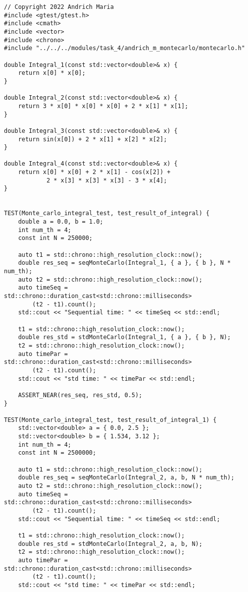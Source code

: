 \documentclass{report}
\begin{document}
\begin{lstlisting}
// Copyright 2022 Andrich Maria
#include <gtest/gtest.h>
#include <cmath>
#include <vector>
#include <chrono>
#include "../../../modules/task_4/andrich_m_montecarlo/montecarlo.h"

double Integral_1(const std::vector<double>& x) {
    return x[0] * x[0];
}

double Integral_2(const std::vector<double>& x) {
    return 3 * x[0] * x[0] * x[0] + 2 * x[1] * x[1];
}

double Integral_3(const std::vector<double>& x) {
    return sin(x[0]) + 2 * x[1] + x[2] * x[2];
}

double Integral_4(const std::vector<double>& x) {
    return x[0] * x[0] + 2 * x[1] - cos(x[2]) +
            2 * x[3] * x[3] * x[3] - 3 * x[4];
}


TEST(Monte_carlo_integral_test, test_result_of_integral) {
    double a = 0.0, b = 1.0;
    int num_th = 4;
    const int N = 250000;

    auto t1 = std::chrono::high_resolution_clock::now();
    double res_seq = seqMonteCarlo(Integral_1, { a }, { b }, N * num_th);
    auto t2 = std::chrono::high_resolution_clock::now();
    auto timeSeq = std::chrono::duration_cast<std::chrono::milliseconds>
        (t2 - t1).count();
    std::cout << "Sequential time: " << timeSeq << std::endl;

    t1 = std::chrono::high_resolution_clock::now();
    double res_std = stdMonteCarlo(Integral_1, { a }, { b }, N);
    t2 = std::chrono::high_resolution_clock::now();
    auto timePar = std::chrono::duration_cast<std::chrono::milliseconds>
        (t2 - t1).count();
    std::cout << "std time: " << timePar << std::endl;

    ASSERT_NEAR(res_seq, res_std, 0.5);
}

TEST(Monte_carlo_integral_test, test_result_of_integral_1) {
    std::vector<double> a = { 0.0, 2.5 };
    std::vector<double> b = { 1.534, 3.12 };
    int num_th = 4;
    const int N = 2500000;

    auto t1 = std::chrono::high_resolution_clock::now();
    double res_seq = seqMonteCarlo(Integral_2, a, b, N * num_th);
    auto t2 = std::chrono::high_resolution_clock::now();
    auto timeSeq = std::chrono::duration_cast<std::chrono::milliseconds>
        (t2 - t1).count();
    std::cout << "Sequential time: " << timeSeq << std::endl;

    t1 = std::chrono::high_resolution_clock::now();
    double res_std = stdMonteCarlo(Integral_2, a, b, N);
    t2 = std::chrono::high_resolution_clock::now();
    auto timePar = std::chrono::duration_cast<std::chrono::milliseconds>
        (t2 - t1).count();
    std::cout << "std time: " << timePar << std::endl;


\end{lstlisting}
\end{document}
